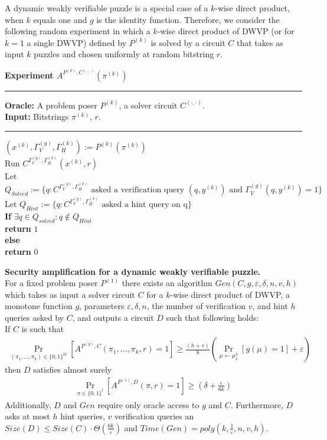 %
A dynamic weakly verifiable puzzle is a special case of a $k$-wise direct product, when $k$ equals one and $g$ is the identity function.
Therefore, we consider the following random experiment in which a $k$-wise direct product of DWVP (or for $k=1$ a single DWVP)
defined by $P^{(k)}$ is solved by a circuit $C$ that takes as input $k$ puzzles and chosen uniformly at random bitstring $r$.
%
\begin{codeblock}
  \textbf{Experiment $A^{P^{(k)}, C^{(\cdot, \cdot)}}(\pi^{(k)})$}
  \medskip
  \hrule
  \medskip
  \textbf{Oracle:} A problem poser $P^{(k)}$, a solver circuit $C^{(\cdot,\cdot)}$.\\
  \textbf{Input:}  Bitstrings $\pi^{(k)}$, $r$.
  \medskip\hrule\medskip
  $(x^{(k)}, \Gamma_V^{(g)}, \Gamma_H^{(k)}) := P^{(k)}(\pi^{(k)})$ \\
  Run $C^{\Gamma_V^{(g)},\Gamma_H^{(k)}}(x^{(k)}, r)$ \\
  \IndI Let $Q_{Solved} := \{q: \text{$C^{\Gamma_V^{(g)}, \Gamma_H^{(k)}}$ asked a verification query $(q,y^{(k)})$ and $\Gamma_V^{(g)}(q, y^{(k)}) = 1$} \}$\\
  \IndI Let $Q_{Hint} := \{q: \text{$C^{\Gamma_V^{(g)}, \Gamma_H^{(k)}}$ asked a hint query on q} \}$\\
  \textbf{If} $\exists q \in Q_{solved} : q \notin Q_{Hint}$ \then \\
  \IndI \textbf{return} $1$\\
  \textbf{else} \\
  \IndI \textbf{return} $0$\\
\end{codeblock}
%
\begin{theorem}{\textbf{Security amplification for a dynamic weakly verifiable puzzle.}}
\label{th:sec_amp_for_dwvp}\\
For a fixed problem poser $P^{(1)}$ there exists an algorithm $Gen(C, g, \varepsilon, \delta, n, v, h)$ which takes as input a solver circuit $C$ for a $k$-wise
direct product of DWVP, a monotone function $g$, parameters $\varepsilon, \delta,n$, the number of verification $v$, and hint $h$ queries asked by $C$, and outputs a circuit $D$
such that following holds: \\
If $C$ is such that \\
  \begin{align*}
    \underset{(\pi_1, \dots, \pi_k) \in \{0,1\}^{kl}}{\Pr}[A^{P^{(g)}, C}(\pi_1, \dots, \pi_k, r) = 1]
    \geq \frac{(h+v)}{8} \left(\underset{\mu \leftarrow \mu_\delta^k}{\Pr}[g(\mu) = 1] + \varepsilon\right)
  \end{align*}
then $D$ satisfies almost surely
  \begin{align*}
    \underset{\pi \in \{0,1\}^{l}}{\Pr}[A^{P^{(1)},D}(\pi, r) = 1] \geq (\delta + \frac{\varepsilon}{6k})
  \end{align*}
Additionally, $D$ and $Gen$ require only oracle access to $g$ and $C$. Furthermore, $D$ asks at most $h$ hint queries, $v$ verification queries an
$Size(D) \leq Size(C) \cdot \Theta(\frac{6k}{\varepsilon})$ and $Time(Gen) = poly(k, \frac{1}{\varepsilon}, n, v, h)$.
\end{theorem}
